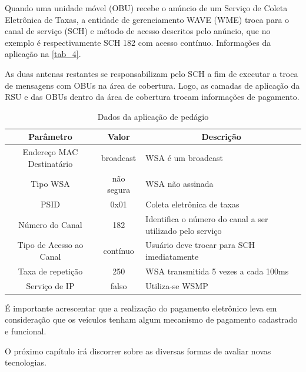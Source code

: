 \documentclass[
12pt,				%
openright,			%
oneside,			%
a4paper,			%
brazil,				%
]{abntex2}
\begin{document}
	\par Quando uma unidade móvel (OBU) recebe o anúncio de um Serviço de Coleta Eletrônica de Taxas, a entidade de gerenciamento WAVE (WME) troca para o canal de serviço (SCH) e método de acesso descritos pelo anúncio, que no exemplo é respectivamente SCH 182 com acesso contínuo. Informações da aplicação na \autoref{tab_4}.
	
	\par As duas antenas restantes se responsabilizam pelo SCH a fim de executar a troca de mensagens com OBUs na área de cobertura. Logo, as camadas de aplicação da RSU e das OBUs dentro da área de cobertura trocam informações de pagamento.
	
	
	\begin{table}[H]
		\centering
		\renewcommand{\arraystretch}{1.5}
		\begin{tabular}{|c|c|p{6cm}|} \hline
			\textbf{Parâmetro} &	\textbf{Valor} &	\multicolumn{1}{c|}{\textbf{Descrição}} \\ \hline
			Endereço MAC Destinatário & broadcast & WSA é um broadcast \\ \hline
			Tipo WSA & não segura & WSA não assinada \\ \hline
			PSID & 0x01 & Coleta eletrônica de taxas \\ \hline
			Número do Canal & 182 &	Identifica o número do canal a ser utilizado pelo serviço \\ \hline
			Tipo de Acesso ao Canal & contínuo & Usuário deve trocar para SCH imediatamente \\ \hline
			Taxa de repetição & 250 &	WSA transmitida 5 vezes a cada 100ms \\ \hline
			Serviço de IP & falso & Utiliza-se WSMP \\ \hline
		\end{tabular}	
			\caption{\label{tab_4}Dados da aplicação de pedágio}
	\end{table}			
	
	\par É importante acrescentar que a realização do pagamento eletrônico leva em consideração que os veículos tenham algum mecanismo de pagamento cadastrado e funcional.

	\par O próximo capítulo irá discorrer sobre as diversas formas de avaliar novas tecnologias.

	\newpage
\end{document}
